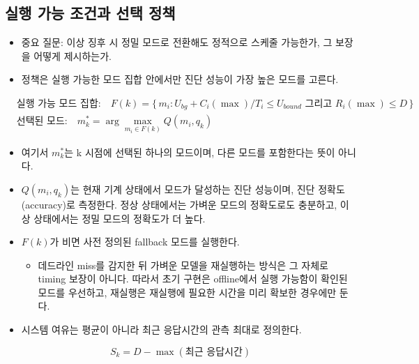 \documentclass[10pt]{article}
\begin{document}
\subsection{실행 가능 조건과 선택 정책}
\begin{itemize}
\item 중요 질문: 이상 징후 시 정밀 모드로 전환해도 정적으로 스케줄 가능한가, 그 보장을 어떻게 제시하는가.
\item 정책은 실행 가능한 모드 집합 안에서만 진단 성능이 가장 높은 모드를 고른다.
\end{itemize}
\begin{align*}
&\text{실행 가능 모드 집합:}\quad F(k) = \{\, m_i : U_{bg} + C_i(\max)/T_i \le U_{bound} \text{ 그리고 } R_i(\max) \le D \,\} \\
&\text{선택된 모드:}\quad m^{*}_k = \arg\max_{m_i \in F(k)} Q(m_i, q_k)
\end{align*}
\begin{itemize}
\item 여기서 $m^{*}_k$는 k 시점에 선택된 하나의 모드이며, 다른 모드를 포함한다는 뜻이 아니다.
\item $Q(m_i, q_k)$는 현재 기계 상태에서 모드가 달성하는 진단 성능이며, 진단 정확도(accuracy)로 측정한다. 정상 상태에서는 가벼운 모드의 정확도로도 충분하고, 이상 상태에서는 정밀 모드의 정확도가 더 높다.
\item $F(k)$가 비면 사전 정의된 fallback 모드를 실행한다.
\begin{itemize}
\item 데드라인 miss를 감지한 뒤 가벼운 모델을 재실행하는 방식은 그 자체로 timing 보장이 아니다. 따라서 초기 구현은 offline에서 실행 가능함이 확인된 모드를 우선하고, 재실행은 재실행에 필요한 시간을 미리 확보한 경우에만 둔다.
\end{itemize}
\item 시스템 여유는 평균이 아니라 최근 응답시간의 관측 최대로 정의한다.
\end{itemize}
\[ S_k = D - \max(\text{최근 응답시간}) \]
\end{document}
